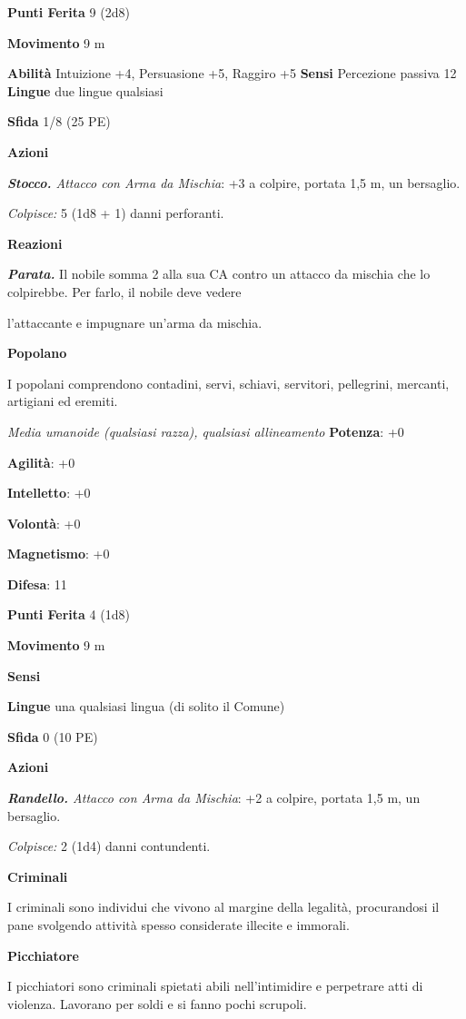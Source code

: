 \begin{multicols}{2}
\textbf{Punti Ferita} 9 (2d8)

\textbf{Movimento} 9 m

\textbf{Abilità} Intuizione +4, Persuasione +5, Raggiro +5
\textbf{Sensi} Percezione passiva 12 \textbf{Lingue} due lingue
qualsiasi

\textbf{Sfida} 1/8 (25 PE)

\textbf{Azioni}

\emph{\textbf{Stocco.} Attacco con Arma da Mischia}: +3 a colpire,
portata 1,5 m, un bersaglio.

\emph{Colpisce:} 5 (1d8 + 1) danni perforanti.

\textbf{Reazioni}

\emph{\textbf{Parata.}} Il nobile somma 2 alla sua CA contro un attacco
da mischia che lo colpirebbe. Per farlo, il nobile deve vedere

l'attaccante e impugnare un'arma da mischia.

\textbf{Popolano}

I popolani comprendono contadini, servi, schiavi, servitori, pellegrini,
mercanti, artigiani ed eremiti.

\emph{Media umanoide (qualsiasi razza), qualsiasi allineamento}
\textbf{Potenza}: +0

\textbf{Agilità}: +0

\textbf{Intelletto}: +0

\textbf{Volontà}: +0

\textbf{Magnetismo}: +0

\textbf{Difesa}: 11

\textbf{Punti Ferita} 4 (1d8)

\textbf{Movimento} 9 m

\textbf{Sensi} 

\textbf{Lingue} una qualsiasi lingua (di solito il Comune)

\textbf{Sfida} 0 (10 PE)

\textbf{Azioni}

\emph{\textbf{Randello.} Attacco con Arma da Mischia}: +2 a colpire,
portata 1,5 m, un bersaglio.

\emph{Colpisce:} 2 (1d4) danni contundenti.

\textbf{Criminali}

I criminali sono individui che vivono al margine della legalità,
procurandosi il pane svolgendo attività spesso considerate illecite e
immorali.

\textbf{Picchiatore}

I picchiatori sono criminali spietati abili nell'intimidire e perpetrare
atti di violenza. Lavorano per soldi e si fanno pochi scrupoli.


\end{multicols}
